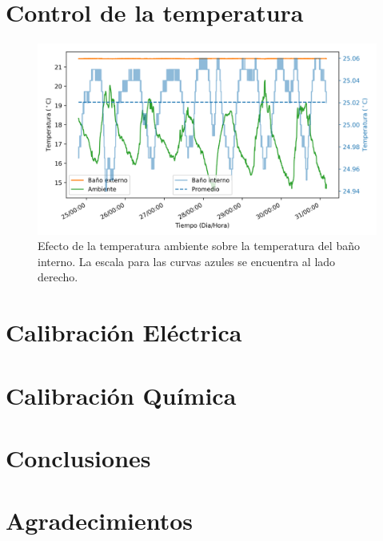 \documentclass[a0]{sciposter}
\begin{document}
\begin{multicols}{3}
\section{Control de la temperatura}
	\begin{figure}[h]
		\centering
		\includegraphics[width=\linewidth]{../Data/TemperatureStability/temperatureStability}
		\caption{Efecto de la temperatura ambiente sobre la temperatura del baño interno. La escala para las curvas azules se encuentra al lado derecho.}
	\end{figure}
\section{Calibraci\'on El\'ectrica}
\section{Calibraci\'on Qu\'imica}
\section{Conclusiones}
\printbibliography[heading=bibintoc, title={Referencias}]
\section*{Agradecimientos}

\end{multicols}
\end{document}
